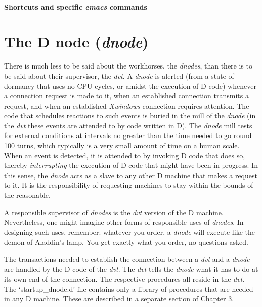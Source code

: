 \paragraph{Shortcuts and specific \emph{emacs} commands}


  

\section{The D node (\emph{dnode})}

There is much less to be said about the workhorses, the \emph{dnodes}, than there is to be said about their supervisor, the \emph{dvt}. A \emph{dnode} is alerted (from a state of dormancy that uses no CPU cycles, or amidst the execution of D code) whenever a connection request is made to it, when an established connection transmits a request, and when an established \emph{Xwindows} connection requires attention. The code that schedules reactions to such events is buried in the mill of the \emph{dnode} (in the \emph{dvt} these events are attended to by code written in D). The \emph{dnode} mill tests for external conditions at intervals no greater than the time needed to go round 100 turns, which typically is a very small amount of time on a human scale. When an event is detected, it is attended to by invoking D code that does so, thereby \emph{interrupting} the execution of D code that might have been in progress. In this sense, the \emph{dnode} acts as a slave to any other D machine that makes a request to it. It is the responsibility of requesting machines to stay within the bounds of the reasonable.

A responsible supervisor of \emph{dnodes} is the \emph{dvt} version of the D machine. Nevertheless, one might imagine other forms of responsible uses of \emph{dnodes}. In designing such uses, remember: whatever you order, a \emph{dnode} will execute like the demon of Aladdin's lamp. You get exactly what you order, no questions asked.

The transactions needed to establish the connection between a \emph{dvt} and a \emph{dnode} are handled by the D code of the \emph{dvt}. The \emph{dvt} tells the \emph{dnode} what it has to do at its own end of the connection. The respective procedures all reside in the \emph{dvt}. The `startup\_dnode.d' file contains only a library of procedures that are needed in any D machine. These are described in a separate section of Chapter 3.
